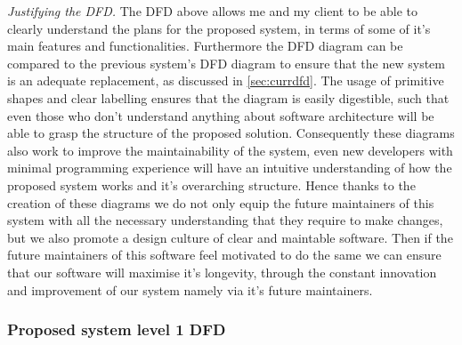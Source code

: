 \textit{Justifying the DFD.} The DFD above allows me and my 
client to be able to clearly understand the plans for the 
proposed system, in terms of some of it's main features and 
functionalities. Furthermore the DFD diagram can be compared to
the previous system's DFD diagram to ensure that the new 
system is an adequate replacement, as discussed in
\ref{sec:currdfd}. The usage of primitive shapes and clear 
labelling ensures that the diagram is easily digestible, such 
that even those who don't understand anything about software
architecture will be able to grasp the structure of the 
proposed solution. Consequently these diagrams also work to 
improve the maintainability of the system, even new developers
with minimal programming experience will have an intuitive 
understanding of how the proposed system works and it's
overarching structure. Hence thanks to the creation of these 
diagrams we do not only equip the future maintainers of this 
system with all the necessary understanding that they require
to make changes, but we also promote a design culture of clear
and maintable software. Then if the future maintainers of this
software feel motivated to do the same we can ensure that our 
software will maximise it's longevity, through the constant 
innovation and improvement of our system namely via it's 
future maintainers.

\subsubsection{Proposed system level 1 DFD} 

